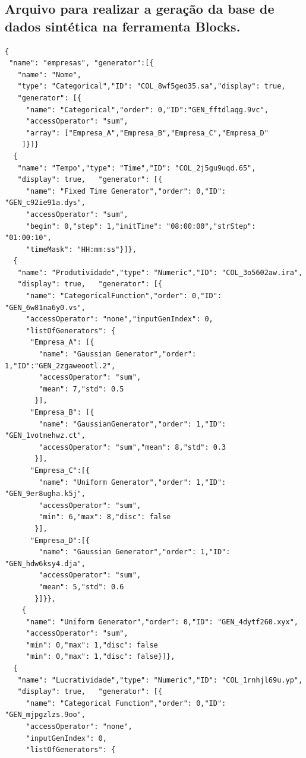 \documentclass[
	12pt,				%
	openright,			%
	oneside,			%
	a4paper,			%
	english,			%
	brazil				%
	]{abntex2}
\begin{document}
\begin{anexosenv}

\partanexos

\chapter{Arquivo para realizar a geração da base de dados sintética na ferramenta Blocks\cite{blocks}. }
\label{ch:anexo}

\begin{verbatim}
{
 "name": "empresas", "generator":[{
   "name": "Nome",
   "type": "Categorical","ID": "COL_8wf5geo35.sa","display": true,
   "generator": [{
     "name": "Categorical","order": 0,"ID":"GEN_fftdlaqg.9vc",
     "accessOperator": "sum",
     "array": ["Empresa_A","Empresa_B","Empresa_C","Empresa_D"
    ]}]}
  {
   "name": "Tempo","type": "Time","ID": "COL_2j5gu9uqd.65",
   "display": true,   "generator": [{
     "name": "Fixed Time Generator","order": 0,"ID": "GEN_c92ie91a.dys",
     "accessOperator": "sum",
     "begin": 0,"step": 1,"initTime": "08:00:00","strStep": "01:00:10",
     "timeMask": "HH:mm:ss"}]},
  {
   "name": "Produtividade","type": "Numeric","ID": "COL_3o5602aw.ira",
   "display": true,   "generator": [{
     "name": "CategoricalFunction","order": 0,"ID": "GEN_6w81na6y0.vs",
     "accessOperator": "none","inputGenIndex": 0,
     "listOfGenerators": {
      "Empresa_A": [{
        "name": "Gaussian Generator","order": 1,"ID":"GEN_2zgaweootl.2",
        "accessOperator": "sum",
        "mean": 7,"std": 0.5
       }],
      "Empresa_B": [{
        "name": "GaussianGenerator","order": 1,"ID": "GEN_1votnehwz.ct",
        "accessOperator": "sum","mean": 8,"std": 0.3
       }],
      "Empresa_C":[{
        "name": "Uniform Generator","order": 1,"ID": "GEN_9er8ugha.k5j",
        "accessOperator": "sum",
        "min": 6,"max": 8,"disc": false
       }],
      "Empresa_D":[{
        "name": "Gaussian Generator","order": 1,"ID": "GEN_hdw6ksy4.dja",
        "accessOperator": "sum",
        "mean": 5,"std": 0.6
       }]}},
    {
     "name": "Uniform Generator","order": 0,"ID": "GEN_4dytf260.xyx",
     "accessOperator": "sum",
     "min": 0,"max": 1,"disc": false
     "min": 0,"max": 1,"disc": false}]},
  {
   "name": "Lucratividade","type": "Numeric","ID": "COL_1rnhjl69u.yp",
   "display": true,   "generator": [{
     "name": "Categorical Function","order": 0,"ID": "GEN_mjpgzlzs.9oo",
     "accessOperator": "none",
     "inputGenIndex": 0,
     "listOfGenerators": {

\end{verbatim}
\end{anexosenv}
\end{document}
